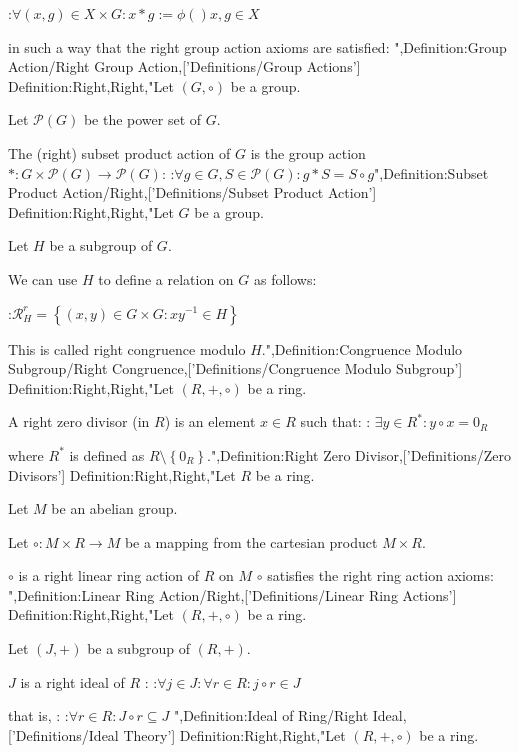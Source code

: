 :$\forall \left( x, g \right) \in X \times G : x * g := \phi \left(   \right){x, g} \in X$

in such a way that the right group action axioms are satisfied:
",Definition:Group Action/Right Group Action,['Definitions/Group Actions']
Definition:Right,Right,"Let $\left( G, \circ \right)$ be a group.

Let $\mathcal P \left( G \right)$ be the power set of $G$.


The (right) subset product action of $G$ is the group action $*: G \times \mathcal P \left( G \right) \to \mathcal P \left( G \right)$:
:$\forall g \in G, S \in \mathcal P \left( G \right): g * S = S \circ g$",Definition:Subset Product Action/Right,['Definitions/Subset Product Action']
Definition:Right,Right,"Let $G$ be a group.

Let $H$ be a subgroup of $G$.


We can use $H$ to define a relation on $G$ as follows:

:$\mathcal R^r_H = \left\lbrace \left( x, y \right) \in G \times G: x y^{-1} \in H \right\rbrace$

This is called right congruence modulo $H$.",Definition:Congruence Modulo Subgroup/Right Congruence,['Definitions/Congruence Modulo Subgroup']
Definition:Right,Right,"Let $\left( R, +, \circ \right)$ be a ring.


A right zero divisor (in $R$) is an element $x \in R$ such that:
: $\exists y \in R^*: y \circ x = 0_R$

where $R^*$ is defined as $R \setminus \left\lbrace 0_R \right\rbrace$.",Definition:Right Zero Divisor,['Definitions/Zero Divisors']
Definition:Right,Right,"Let $R$ be a ring.

Let $M$ be an abelian group.

Let $\circ : M \times R \to M$ be a mapping from the cartesian product $M \times R$.


$\circ$ is a right linear ring action of $R$ on $M$  $\circ$ satisfies the right ring action axioms:
",Definition:Linear Ring Action/Right,['Definitions/Linear Ring Actions']
Definition:Right,Right,"Let $\left( R, +, \circ \right)$ be a ring.

Let $\left( J, + \right)$ be a subgroup of $\left( R, + \right)$.


$J$ is a right ideal of $R$ :
:$\forall j \in J: \forall r \in R: j \circ r \in J$

that is, :
:$\forall r \in R: J \circ r \subseteq J$
",Definition:Ideal of Ring/Right Ideal,['Definitions/Ideal Theory']
Definition:Right,Right,"Let $\left( R, +, \circ \right)$ be a ring.

